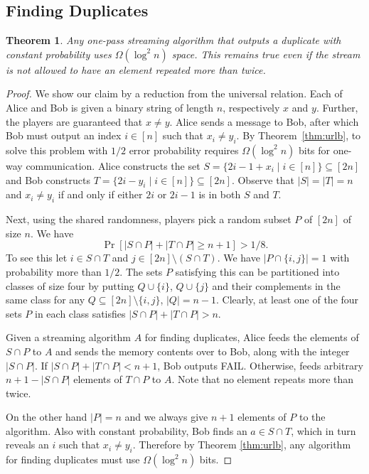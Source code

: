 \documentclass[9pt,letterpaper]{article}
\newtheorem{theorem}{Theorem}
\theoremstyle{remark}
\begin{document}
\subsection{Finding Duplicates}\label{sec:dublb}
\begin{theorem}\label{thm:duplb}
Any one-pass streaming algorithm that outputs a duplicate with constant
probability  uses $\Omega(\log^2 n)$ space. This remains true even if the
stream is not allowed to have an element repeated more than twice. 
\end{theorem}
\begin{proof}
We show our claim by a reduction from the universal relation. Each of
 Alice and Bob is given a binary string of length $n$, respectively $x$ 
and $y$. Further, the players are guaranteed that $x\neq y$. Alice 
sends a message to Bob, after which Bob must output an index 
$i\in[n]$ such that $x_i\neq y_i$. By Theorem~\ref{thm:urlb}, to solve this 
problem with $1/2$ error probability requires $\Omega(\log^2 n)$ bits for one-way communication. 
Alice constructs the set $S=\{2i-1+x_i\mid i\in[n]\}\subseteq[2n]$ and Bob
constructs $T=\{2i-y_i\mid i\in[n]\}\subseteq[2n]$. Observe that $|S|=|T|=n$ 
and $x_i\neq y_i$ if and only if either $2i$ or $2i-1$ is in both $S$ and
$T$.

Next, using the shared randomness, players pick a random subset 
$P$ of $[2n]$ of size $n$. We have
$$\Pr[|S\cap P| + |T\cap P|\geq n+1]>1/8.$$
To see this let $i\in S\cap T$ and $j\in[2n]\setminus(S\cap T)$. We have
$|P\cap\{i,j\}|=1$ with probability more than $1/2$. The sets $P$ satisfying
this can be partitioned into classes of size four by putting $Q\cup\{i\}$,
$Q\cup\{j\}$ and their complements in the same class for any
$Q\subseteq[2n]\setminus\{i,j\}$, $|Q|=n-1$. Clearly, at least one of the four
sets $P$ in each class satisfies $|S\cap P|+|T\cap P|>n$.

Given a streaming 
algorithm $A$ for finding duplicates, Alice feeds the elements of 
$S\cap P$ to $A$ and sends the memory contents over to Bob, 
along with the integer $|S\cap P|$. If $|S\cap P|+|T\cap P|<n+1$, 
Bob outputs FAIL. Otherwise, feeds arbitrary $n+1-|S\cap P|$ 
elements of $T\cap P$ to $A$. Note that no element repeats more than twice.

On the other hand $|P|=n$ and we always give $n+1$ elements of $P$ 
to the algorithm. Also with constant probability, Bob finds an 
$a\in S \cap T$, which in turn reveals an $i$ such that $x_i\neq y_i$. 
Therefore by Theorem \ref{thm:urlb}, any algorithm for finding 
duplicates must use $\Omega(\log^2 n)$ bits.
\end{proof}
\end{document}
